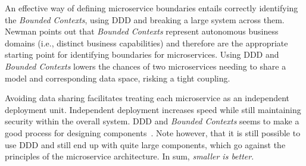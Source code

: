 \documentclass[a4paper,twoside]{article}
\begin{document}
An effective way of defining microservice boundaries entails correctly identifying the \textit{Bounded Contexts}, using DDD and breaking a large system across them. Newman points out that \textit{Bounded Contexts} represent autonomous business domains (i.e., distinct business capabilities) and therefore are the appropriate starting point for identifying boundaries for microservices. Using DDD and \textit{Bounded Contexts} lowers the chances of two microservices needing to share a model and corresponding data space, risking a tight coupling.

Avoiding data sharing facilitates treating each microservice as an independent deployment unit. Independent deployment increases speed while still maintaining security within the overall system. DDD and \textit{Bounded Contexts} seems to make a good process for designing components~\cite{newman2015building}. Note however, that it is still possible to use DDD and still end up with quite large components, which go against the principles of the microservice architecture. In sum, \textit{smaller is better}.


\end{document}
